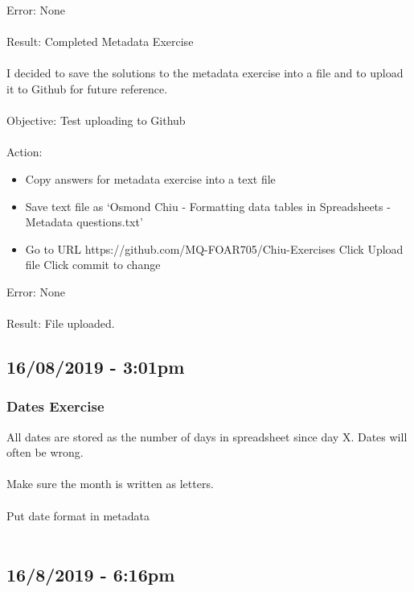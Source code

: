 \documentclass{article}
\begin{document}
Error: None\\\\
Result: Completed Metadata Exercise\\\\
I decided to save the solutions to the metadata exercise into a file and to upload it to Github for future reference.\\\\
Objective: Test uploading to Github\\\\
Action:\\
\begin{itemize}
\item Copy answers for metadata exercise into a text file
\item Save text file as ‘Osmond Chiu - Formatting data tables in Spreadsheets - Metadata questions.txt’
\item Go to URL https://github.com/MQ-FOAR705/Chiu-Exercises
Click Upload file
Click commit to change
\end{itemize}
Error: None\\\\
Result: File uploaded.

\subsection*{16/08/2019 - 3:01pm}
\subsubsection*{Dates Exercise}
All dates are stored as the number of days in spreadsheet since day X. Dates will often be wrong.\\\\
Make sure the month is written as letters.\\\\
Put date format in metadata\\\\
\subsection*{16/8/2019 - 6:16pm}
\end{document}
